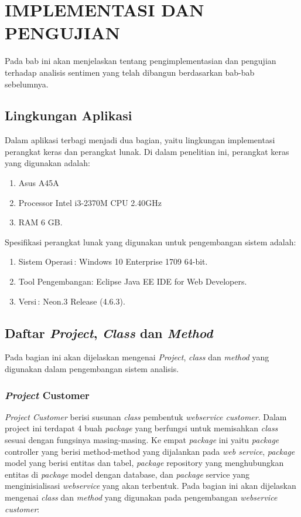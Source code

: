 \chapter{IMPLEMENTASI DAN PENGUJIAN}

%
\vspace{4.5pt}
Pada bab ini akan menjelaskan tentang pengimplementasian dan pengujian terhadap analisis sentimen yang telah dibangun berdasarkan bab-bab sebelumnya.
\section{Lingkungan Aplikasi}
Dalam aplikasi terbagi menjadi dua bagian, yaitu lingkungan implementasi perangkat keras dan perangkat lunak. Di dalam penelitian ini, perangkat keras yang digunakan adalah:
\begin{enumerate}[leftmargin=*]
	\item Asus A45A
	\item Processor Intel i3-2370M CPU 2.40GHz
	\item RAM 6 GB.
\end{enumerate}

Spesifikasi perangkat lunak yang digunakan untuk pengembangan sistem adalah:
\begin{enumerate}[leftmargin=*]
	\item Sistem Operasi\quad\quad\quad\,: Windows 10 Enterprise 1709 64-bit.
	\item Tool Pengembangan\quad: Eclipse Java EE IDE for Web Developers.
	\item Versi\quad\quad\quad\quad\quad\quad\quad\,: Neon.3 Release (4.6.3).
\end{enumerate}

\section{Daftar \textit{Project}, \textit{Class} dan \textit{Method}}
Pada bagian ini akan dijelaskan mengenai \textit{Project}, \textit{class} dan \textit{method} yang digunakan dalam pengembangan sistem analisis.
\subsection{\textit{Project} Customer}
\textit{Project Customer} berisi susunan \textit{class} pembentuk \textit{webservice customer}. Dalam project ini terdapat 4 buah \textit{package} yang berfungsi untuk memisahkan \textit{class} sesuai dengan fungsinya masing-masing. Ke empat \textit{package} ini yaitu \textit{package} controller yang berisi method-method yang dijalankan pada \textit{web service}, \textit{package} model yang berisi entitas dan tabel, \textit{package} repository yang menghubungkan entitas di \textit{package} model dengan database, dan \textit{package} service yang menginisialisasi \textit{webservice} yang akan terbentuk. Pada bagian ini akan dijelaskan mengenai \textit{class} dan \textit{method} yang digunakan pada pengembangan \textit{ webservice customer}:
